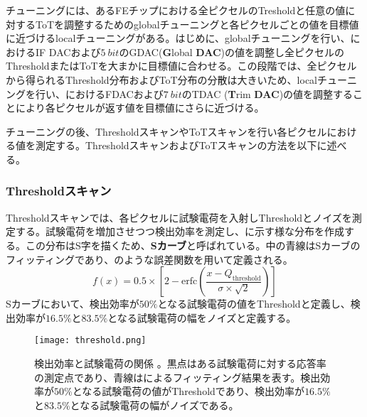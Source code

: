 チューニングには、あるFEチップにおける全ピクセルのTresholdと任意の値に対するToTを調整するためのglobalチューニングと各ピクセルごとの値を目標値に近づけるlocalチューニングがある。はじめに、globalチューニングを行い、におけるIF DACおよび$5\ \si{bit}$のGDAC(\textbf{G}lobal \textbf{DAC})の値を調整し全ピクセルのThresholdまたはToTを大まかに目標値に合わせる。この段階では、全ピクセルから得られるThreshold分布およびToT分布の分散は大きいため、localチューニングを行い、におけるFDACおよび$7\ \si{bit}$のTDAC (\textbf{T}rim \textbf{DAC})の値を調整することにより各ピクセルが返す値を目標値にさらに近づける。

チューニングの後、ThresholdスキャンやToTスキャンを行い各ピクセルにおける値を測定する。ThresholdスキャンおよびToTスキャンの方法を以下に述べる。

\subsubsection{Thresholdスキャン}
\label{sec:thresholdscan}
Thresholdスキャンでは、各ピクセルに試験電荷を入射しThresholdとノイズを測定する。試験電荷を増加させつつ検出効率を測定し、に示す様な分布を作成する。この分布はS字を描くため、\textbf{Sカーブ}と呼ばれている。中の青線はSカーブのフィッティングであり、のような誤差関数を用いて定義される。
\begin{equation}
  \label{eq:gosakannsuu}
  f(x)=0.5\times\left[ 2-\mathrm{erfc}\left( \frac{x-Q_\mathrm{threshold}}{\sigma \times \sqrt{2}} \right)  \right]
\end{equation}
Sカーブにおいて、検出効率が$50\%$となる試験電荷の値をThresholdと定義し、検出効率が$16.5\%$と$83.5\%$となる試験電荷の幅をノイズと定義する。

\begin{figure}[tbp]
  \centering
  \texttt{[image: threshold.png]}
  \caption[検出効率と試験電荷の関係]{検出効率と試験電荷の関係 \cite{calibnoise}。黒点はある試験電荷に対する応答率の測定点であり、青線はによるフィッティング結果を表す。検出効率が$50\%$となる試験電荷の値がThresholdであり、検出効率が$16.5\%$と$83.5\%$となる試験電荷の幅がノイズである。}
  \label{fig:threshold}
\end{figure}


